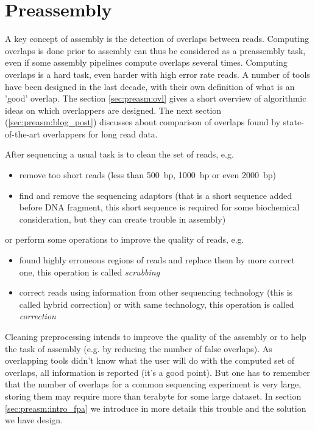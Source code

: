 \documentclass[main.tex]{subfiles}
\begin{document}
\chapter{Preassembly} \label{chapter:preassembly}

A key concept of assembly is the detection of overlaps between reads. Computing overlaps is done prior to assembly can thus be considered as a preassembly task, even if some assembly pipelines compute overlaps several times. Computing overlaps is a hard task, even harder with high error rate reads. A number of tools have been designed in the last decade, with their own definition of what is an 'good' overlap. The section \ref{sec:preasm:ovl} gives a short overview of algorithmic ideas on which overlappers are designed. The next section (\ref{sec:preasm:blog_post}) discusses about comparison of overlaps found by state-of-the-art overlappers for long read data. 

\bigskip

After sequencing a usual task is to clean the set of reads, e.g.
\begin{itemize}
	\item remove too short reads (less than 500~bp, 1000~bp or even 2000~bp)
	\item find and remove the sequencing adaptors (that is a short sequence added before DNA fragment, this short sequence is required for some biochemical consideration, but they can create trouble in assembly)
\end{itemize}
or perform some operations to improve the quality of reads, e.g.
\begin{itemize}
	\item found highly erroneous regions of reads and replace them by more correct one, this operation is called \emph{scrubbing}
	\item correct reads using information from other sequencing technology (this is called hybrid correction) or with same technology, this operation is called \emph{correction} 
\end{itemize}
Cleaning preprocessing intends to improve the quality of the assembly or to help the task of assembly (e.g. by reducing the number of false overlaps). 
As overlapping tools didn't know what the user will do with the computed set of overlaps, all information is reported (it's a good point). But one has to remember that the number of overlaps for a common sequencing experiment is very large, storing them may require more than terabyte for some large dataset. In section \ref{sec:preasm:intro_fpa} we introduce in more details this trouble and the solution we have design. 
\end{document}
